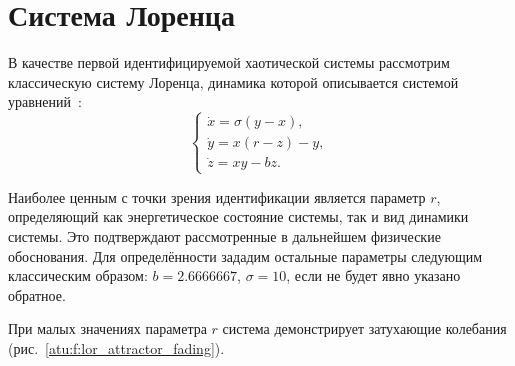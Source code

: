 
\FloatBarrier
\section{Система Лоренца} %



В качестве первой идентифицируемой хаотической системы рассмотрим классическую
систему Лоренца, динамика которой описывается системой
уравнений~\cite{moon_chaotic_vibr,anisch_nonlin_eff,chulichkcov_mm_ml_dyn}:
%
\begin{equation}
\begin{cases}
  \dot{x} = \sigma (y-x ) , \\
  \dot{y} = x (r-z) - y , \\
  \dot{z} = x y - b z .
\end{cases}
\label{atu:eq:lor}
\end{equation}

Наиболее ценным с точки зрения идентификации является параметр
$r$, определяющий как энергетическое состояние системы,
так и вид динамики системы.
Это подтверждают
рассмотренные в дальнейшем физические обоснования.
Для определённости зададим остальные параметры следующим классическим образом:
$b = 2.6666667$, $\sigma = 10$, если не будет явно указано обратное.


При малых значениях параметра $r$ система демонстрирует
затухающие колебания (рис.~\ref{atu:f:lor_attractor_fading}).

